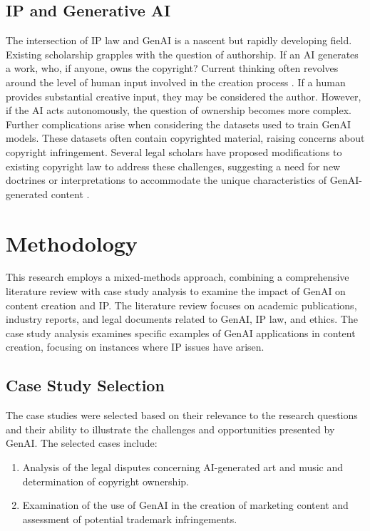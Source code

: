 \documentclass[12pt,a4paper]{article}
\begin{document}
\subsection{IP and Generative AI}

The intersection of IP law and GenAI is a nascent but rapidly developing field.  Existing scholarship grapples with the question of authorship.  If an AI generates a work, who, if anyone, owns the copyright? Current thinking often revolves around the level of human input involved in the creation process \citep{abbott2023ai}. If a human provides substantial creative input, they may be considered the author.  However, if the AI acts autonomously, the question of ownership becomes more complex. Further complications arise when considering the datasets used to train GenAI models.  These datasets often contain copyrighted material, raising concerns about copyright infringement. Several legal scholars have proposed modifications to existing copyright law to address these challenges, suggesting a need for new doctrines or interpretations to accommodate the unique characteristics of GenAI-generated content \citep{crawford2021excavating}.

\section{Methodology}
This research employs a mixed-methods approach, combining a comprehensive literature review with case study analysis to examine the impact of GenAI on content creation and IP. The literature review focuses on academic publications, industry reports, and legal documents related to GenAI, IP law, and ethics. The case study analysis examines specific examples of GenAI applications in content creation, focusing on instances where IP issues have arisen.

\subsection{Case Study Selection}
The case studies were selected based on their relevance to the research questions and their ability to illustrate the challenges and opportunities presented by GenAI. The selected cases include:

\begin{enumerate}
    \item  Analysis of the legal disputes concerning AI-generated art and music and determination of copyright ownership.
    \item Examination of the use of GenAI in the creation of marketing content and assessment of potential trademark infringements.
\end{enumerate}
\end{document}
